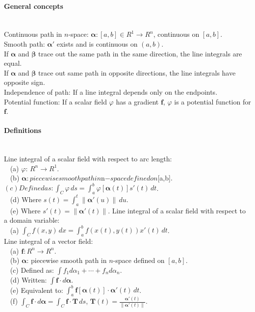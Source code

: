 \documentclass[10pt]{article}
\newcommand{\bs}[1]{\pmb{#1}}
\begin{document}
\paragraph{General concepts}\ \\
Continuous path in $n$-space: $\bs{\alpha}: [a,b] \in R^1 \to R^n$, continuous on $[a,b]$.\\
Smooth path: $\bs{\alpha}'$ exists and is continuous on $(a,b)$.\\
If $\bs{\alpha}$ and $\bs{\beta}$ trace out the same path in the same direction, the line integrals are equal.\\
If $\bs{\alpha}$ and $\bs{\beta}$ trace out same path in opposite directions, the line integrals have opposite sign.\\
Independence of path: If a line integral depends only on the endpoints.\\
Potential function: If a scalar field $\varphi$ has a gradient $\bs{f}$, $\varphi$ is a potential function for $\bs{f}$.

\paragraph{Definitions}\ \\
Line integral of a scalar field with respect to arc length:\\
$\phantom{x}$ (a) $\varphi$: $R^n \to R^1$.\\
$\phantom{x}$ (b) $\bs{\alpha}: piecewise smooth path in $n$-space defined on $[a,b]$.\\
$\phantom{x}$ (c) Defined as: \int_C \varphi\, ds = \int_a^b \varphi[\bs{\alpha}(t)]s'(t)\, dt$.\\
$\phantom{x}$ (d) Where $s(t) = \int_a^t \lVert\bs{\alpha}'(u)\rVert\, du$.\\
$\phantom{x}$ (e) Where $s'(t) = \lVert\bs{\alpha}'(t)\rVert$.
Line integral of a scalar field with respect to a domain variable:\\
$\phantom{x}$ (a) $\int_C f(x, y)\, dx = \int_a^b f(x(t), y(t)) x'(t)\, dt$.\\
Line integral of a vector field:\\
$\phantom{x}$ (a) $\bs{f}: R^n \to R^n$.\\
$\phantom{x}$ (b) $\bs{\alpha}$: piecewise smooth path in $n$-space defined on $[a,b]$.\\
$\phantom{x}$ (c) Defined as: $\int f_1d\alpha_1 + \dotsb + f_nd\alpha_n$.\\
$\phantom{x}$ (d) Written: $\int \bs{f} \cdot d\bs{\alpha}$.\\
$\phantom{x}$ (e) Equivalent to: $\int_a^b \bs{f}[\bs{\alpha}(t)] \cdot \bs{\alpha}'(t)\, dt$.\\
$\phantom{x}$ (f) $\int_C \bs{f}\cdot d\bs{\alpha}=\int_C\bs{f}\cdot \bs{T}\,ds$, 
$\bs{T}(t)=\frac{\bs{\alpha}'(t)}{\lVert\bs{\alpha}'(t)\rVert}$.
\end{document}

